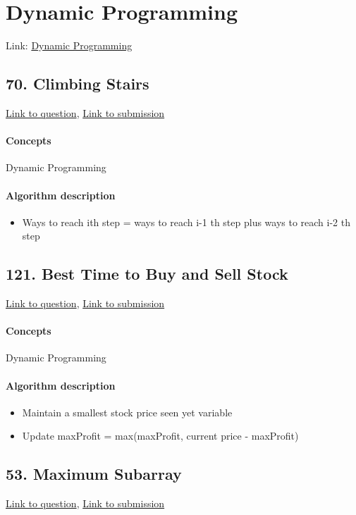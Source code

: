 \documentclass[11pt]{book}
\begin{document}
\newpage

\section{Dynamic Programming}
Link: \href{https://leetcode.com/explore/featured/card/top-interview-questions-easy/97/dynamic-programming/569/}{Dynamic Programming}

\subsection{70. Climbing Stairs}
\href{https://leetcode.com/problems/climbing-stairs/}{Link to question},
\href{https://leetcode.com/submissions/detail/335398986/}{Link to submission}
\paragraph{Concepts}
Dynamic Programming
\paragraph{Algorithm description}
\begin{itemize}
    \item Ways to reach ith step = ways to reach i-1 th step plus ways to reach i-2 th step
\end{itemize}

\subsection{121. Best Time to Buy and Sell Stock}
\href{https://leetcode.com/problems/best-time-to-buy-and-sell-stock/}{Link to question},
\href{https://leetcode.com/submissions/detail/335403058/}{Link to submission}
\paragraph{Concepts}
Dynamic Programming
\paragraph{Algorithm description}
\begin{itemize}
    \item Maintain a smallest stock price seen yet variable
    \item Update maxProfit = max(maxProfit, current price - maxProfit)
\end{itemize}

\subsection{53. Maximum Subarray}
\href{https://leetcode.com/problems/maximum-subarray/}{Link to question},
\href{https://leetcode.com/submissions/detail/335407441/}{Link to submission}
\end{document}
